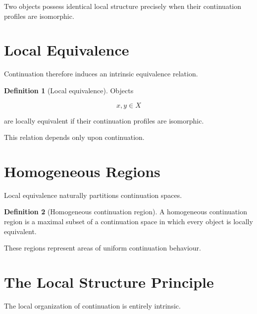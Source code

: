 \documentclass[13pt,openany]{book}
\theoremstyle{plain}
\theoremstyle{definition}
\newtheorem{definition}{Definition}[chapter]
\begin{document}
Two objects possess identical local structure precisely when their continuation
profiles are isomorphic.


\section{Local Equivalence}

Continuation therefore induces an intrinsic equivalence relation.

\begin{definition}[Local equivalence]

Objects

\[
x,y\in X
\]

are locally equivalent if their continuation profiles are isomorphic.

\end{definition}

This relation depends only upon continuation.


\section{Homogeneous Regions}

Local equivalence naturally partitions continuation spaces.

\begin{definition}[Homogeneous continuation region]

A homogeneous continuation region is a maximal subset of a continuation space in
which every object is locally equivalent.

\end{definition}

These regions represent areas of uniform continuation behaviour.


\section{The Local Structure Principle}

The local organization of continuation is entirely intrinsic.
\end{document}
